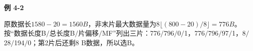 {\color{ink}\bfseries 例 4-2}\par\vspace{1bp}原数据长\(1580-20=\allowbreak{}1560 B\)，非末片最大数据量为\(8\lfloor (800-20)/\allowbreak{}8\rfloor =\allowbreak{}776 B\)。按“数据长度B\(/\allowbreak{}\)总长度B\(/\allowbreak{}\)片偏移\(/\allowbreak{}\)MF”列出三片：776\(/\allowbreak{}\)796\(/\allowbreak{}\)0\(/\allowbreak{}\)1，776\(/\allowbreak{}\)796\(/\allowbreak{}\)97\(/\allowbreak{}\)1，8\(/\allowbreak{}\)28\(/\allowbreak{}\)194\(/\allowbreak{}\)0；第2片后还剩8 B数据，所以选B。
